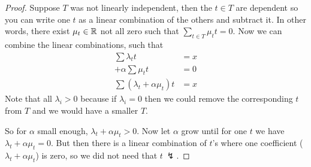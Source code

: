 \documentclass{exam}
\begin{document}
    \begin{proof}
        Suppose $T$ was not linearly independent, then the $t \in T$ are dependent so you can write one $t$ as a linear combination of the others and subtract it.
        In other words, there exist $\mu_t \in \mathbb{R}$ not all zero such that $\sum_{t \in T} \mu_t t =0$.
        Now we can combine the linear combinations, such that
        \begin{align*}
             \sum \lambda_t t &= x  \\ + \alpha \sum \mu_t t &= 0 \\ \hline \hline
            \sum (\lambda_t + \alpha \mu_t) t &= x
        \end{align*}
        Note that all $\lambda_i >0$ because if $\lambda_i = 0$ then we could remove the corresponding $t$ from $T$ and we would have a smaller $T$.

        So for $\alpha$ small enough, $\lambda_t + \alpha \mu_t >0$.
        Now let $\alpha$ grow until for one $t$ we have $\lambda_t + \alpha \mu_t =0$.
        But then there is a linear combination of $t$'s where one coefficient ($\lambda_t + \alpha \mu_t$) is zero, so we did not need that $t \ \lightning$.
    \end{proof}
\end{document}
